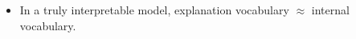 \begin{itemize}
    \item In a truly interpretable model, explanation vocabulary $\approx$ internal vocabulary. 

\end{itemize}

